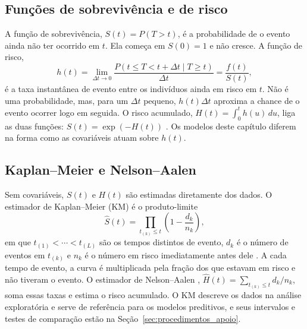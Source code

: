     \subsection{Funções de sobrevivência e de risco}
    \label{subsec:funcoes_sobrevivencia}

A função de sobrevivência, $S(t) = P(T > t)$, é a probabilidade de o evento ainda não ter ocorrido em $t$. Ela começa em $S(0) = 1$ e não cresce. A função de risco,
\begin{equation}
    h(t)
    = \lim_{\Delta t \to 0}
      \frac{P\!\left(t \leq T < t + \Delta t \mid T \geq t\right)}{\Delta t}
    = \frac{f(t)}{S(t)},
    \label{eq:hazard}
\end{equation}
é a taxa instantânea de evento entre os indivíduos ainda em risco em $t$. Não é uma probabilidade, mas, para um $\Delta t$ pequeno, $h(t)\Delta t$ aproxima a chance de o evento ocorrer logo em seguida. O risco acumulado, $H(t) = \int_0^t h(u)\,du$, liga as duas funções: $S(t) = \exp(-H(t))$ \citep{harrell2001}. Os modelos deste capítulo diferem na forma como as covariáveis atuam sobre $h(t)$.

    \subsection{Kaplan--Meier e Nelson--Aalen}
    \label{subsec:kaplanmeier}

Sem covariáveis, $S(t)$ e $H(t)$ são estimadas diretamente dos dados. O estimador de Kaplan--Meier (KM) é o produto-limite
\begin{equation}
    \hat{S}(t) = \prod_{t_{(k)} \leq t} \left(1 - \frac{d_k}{n_k}\right),
    \label{eq:kaplanmeier}
\end{equation}
em que $t_{(1)} < \cdots < t_{(L)}$ são os tempos distintos de evento, $d_k$ é o número de eventos em $t_{(k)}$ e $n_k$ é o número em risco imediatamente antes dele \citep{kaplan1958,kleinbaum2012}. A cada tempo de evento, a curva é multiplicada pela fração dos que estavam em risco e não tiveram o evento. O estimador de Nelson--Aalen \citep{martinussen2006}, $\hat{H}(t) = \sum_{t_{(k)} \leq t} d_k / n_k$, soma essas taxas e estima o risco acumulado. O KM descreve os dados na análise exploratória e serve de referência para os modelos preditivos, e seus intervalos e testes de comparação estão na Seção~\ref{sec:procedimentos_apoio}.

